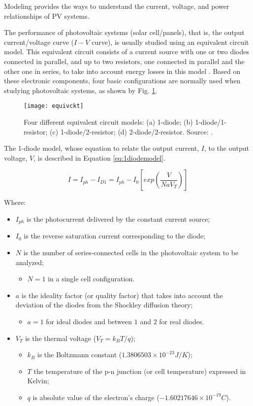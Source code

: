 Modeling provides the ways to understand the current, voltage, and power relationships of PV systems.
  
The performance of photovoltaic systems (solar cell/panels), that is, the output current/voltage curve ($I-V$ curve), is usually studied using an equivalent circuit model. This equivalent circuit consists of a current source with one or two diodes connected in parallel, and up to two resistors, one connected in parallel and the other one in series, to take into account energy losses in this model \cite{Cubas}. Based on these electronic components, four basic configurations are normally used when studying photovoltaic systems, as shown by Fig. \ref{fig:equivckt}. 

\begin{figure}[h]
\texttt{[image: equivckt]}
\centering
\caption{Four different equivalent circuit models: (a) 1-diode; (b) 1-diode/1-resistor; (c) 1-diode/2-resistor; (d) 2-diode/2-resistor. Source: \cite{Cubas}.}
\label{fig:equivckt}
\end{figure}
 
The 1-diode model, whose equation to relate the output current, $I$, to the output voltage, $V$, is described in Equation \ref{eq:1diodemodel}. 

\begin{equation}
\label{eq:1diodemodel}
I = I_{ph}-I_{D1}=I_{ph}-I_{0}\left[ exp \left( \dfrac{V}{NaV_{T}} \right)  \right] 
\end{equation}

Where:
\begin{itemize}
\item $I_{ph}$ is the photocurrent delivered by the constant current source; 
\item $ I_{0} $ is the reverse saturation current corresponding to the diode; 
\item $ N $ is the number of series-connected cells in the photovoltaic system to be analyzed;
	\begin{itemize}
	\item $ N=1 $ in a single cell configuration. 	
	\end{itemize}	  
\item $ a $ is the ideality factor (or quality factor) that takes into account the deviation of the diodes from the Shockley diffusion theory; 
	\begin{itemize}
	\item $a=1$ for ideal diodes and between $ 1 $ and $ 2 $ for real diodes. 	
	\end{itemize}
\item $V_{T}$ is the thermal voltage ($ V_{T}=k_{B}T/q $);
	\begin{itemize}
	\item $ k_{B} $ is the Boltzmann constant ($ 1.3806503\times10^{-23}J/K $); 
	\item $ T $ the temperature of the p-n junction (or cell temperature) expressed in Kelvin; 
	\item $ q $ is absolute value of the electron's charge ($ -1.60217646\times10^{-19}C $).	
	\end{itemize}	 
\end{itemize}



